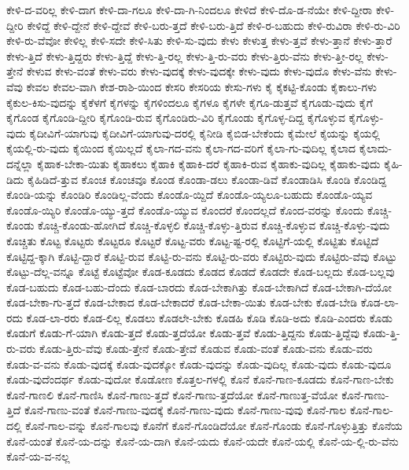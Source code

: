 {ಕೇಳಿ-ದ-ವರಿಲ್ಲ
ಕೇಳಿ-ದಾಗ
ಕೇಳಿ-ದಾ-ಗಲೂ
ಕೇಳಿ-ದಾ-ಗಿ-ನಿಂದಲೂ
ಕೇಳಿದೆ
ಕೇಳಿ-ದೊ-ಡ-ನೆಯೇ
ಕೇಳಿ-ದ್ದೀರಾ
ಕೇಳಿ-ದ್ದೀರಿ
ಕೇಳಿದ್ದೆ
ಕೇಳಿ-ದ್ದೇನೆ
ಕೇಳಿ-ದ್ದೇವೆ
ಕೇಳಿ-ಬರು-ತ್ತದೆ
ಕೇಳಿ-ಬರು-ತ್ತಿದೆ
ಕೇಳಿ-ರ-ಬಹುದು
ಕೇಳಿ-ರುವಿರಾ
ಕೇಳಿ-ರು-ವಿರಿ
ಕೇಳಿ-ರು-ವೆವೋ
ಕೇಳಿಲ್ಲ
ಕೇಳಿ-ಸದೇ
ಕೇಳಿ-ಸಿತು
ಕೇಳಿ-ಸು-ವುದು
ಕೇಳು
ಕೇಳುತ್ತ
ಕೇಳು-ತ್ತವೆ
ಕೇಳು-ತ್ತಾನೆ
ಕೇಳು-ತ್ತಾರೆ
ಕೇಳು-ತ್ತಿದೆ
ಕೇಳು-ತ್ತಿದ್ದರು
ಕೇಳು-ತ್ತಿದ್ದೆ
ಕೇಳು-ತ್ತಿ-ರಲ್ಲ
ಕೇಳು-ತ್ತಿ-ರು-ವರು
ಕೇಳು-ತ್ತಿರು-ವೆನು
ಕೇಳು-ತ್ತೀ-ರಲ್ಲ
ಕೇಳು-ತ್ತೇನೆ
ಕೇಳುವ
ಕೇಳು-ವಂತೆ
ಕೇಳು-ವರು
ಕೇಳು-ವುದಕ್ಕೆ
ಕೇಳು-ವುದಕ್ಕೇ
ಕೇಳು-ವುದು
ಕೇಳು-ವುದೊ
ಕೇಳು-ವೆನು
ಕೇಳು-ವೆವು
ಕೇವಲ
ಕೇವಲ-ವಾಗಿ
ಕೇಶ-ರಾಶಿ-ಯಿಂದ
ಕೇಸರಿ
ಕೇಸರಿಯ
ಕೇಸು-ಗಳು
ಕೈ
ಕೈಕಟ್ಟಿ-ಕೊಂಡು
ಕೈಕಾಲು-ಗಳು
ಕೈಕುಲ-ಕಿಸು-ವುದನ್ನು
ಕೈಕೆಳಗೆ
ಕೈಗಳನ್ನು
ಕೈಗಳಿಂದಲೂ
ಕೈಗಳೂ
ಕೈಗಳೇ
ಕೈಗೂ-ಡುತ್ತವೆ
ಕೈಗೂಡು-ವುದು
ಕೈಗೆ
ಕೈಗೊಂಡ
ಕೈಗೊಂಡಿ-ದ್ದೀರಿ
ಕೈಗೊಂಡಿ-ರುವ
ಕೈಗೊಂಡಿರು-ವಿರಿ
ಕೈಗೊಂಡು
ಕೈಗೊಳ್ಳ-ದಿದ್ದ
ಕೈಗೊಳ್ಳುವ
ಕೈಗೊಳ್ಳು-ವುದು
ಕೈದೀವಿಗೆ-ಯಾಗುವು
ಕೈದೀವಿಗೆ-ಯಾಗುವು-ದರಲ್ಲಿ
ಕೈನೀಡಿ
ಕೈಬಿಡ-ಬೇಕೆಂದು
ಕೈಮೇಲೆ
ಕೈಯನ್ನು
ಕೈಯಲ್ಲಿ
ಕೈಯಲ್ಲಿ-ರು-ವುದು
ಕೈಯಿಂದ
ಕೈಯಿಲ್ಲದೆ
ಕೈಲಾ-ಗದ-ವನು
ಕೈಲಾ-ಗದ-ವರಿಗೆ
ಕೈಲಾ-ಗು-ವುದಿಲ್ಲ
ಕೈಲಾದ
ಕೈಲಾದು-ದನ್ನೆಲ್ಲಾ
ಕೈಹಾಕ-ಬೇಕಾ-ಯಿತು
ಕೈಹಾಕಲು
ಕೈಹಾಕಿ
ಕೈಹಾಕಿ-ದರೆ
ಕೈಹಾಕಿ-ರುವ
ಕೈಹಾಕು-ವುದಿಲ್ಲ
ಕೈಹಾಕು-ವುದು
ಕೈಹಿ-ಡಿದು
ಕೈಹಿಡಿದೆ-ತ್ತುವ
ಕೊಂಚ
ಕೊಂಚವೂ
ಕೊಂಡ
ಕೊಂಡಾ-ಡಲು
ಕೊಂಡಾ-ಡಿವೆ
ಕೊಂಡಾಡಿಸಿ
ಕೊಂಡಿ
ಕೊಂಡಿದ್ದ
ಕೊಂಡಿ-ಯನ್ನು
ಕೊಂಡಿರಿ
ಕೊಂಡಿಲ್ಲ-ವೆಂದು
ಕೊಂಡೊ-ಯ್ದಿದೆ
ಕೊಂಡೊ-ಯ್ಯಲೂ-ಬಹುದು
ಕೊಂಡೊ-ಯ್ಯವ
ಕೊಂಡೊ-ಯ್ಯಿರಿ
ಕೊಂಡೊ-ಯ್ಯು-ತ್ತದೆ
ಕೊಂಡೊ-ಯ್ಯುವ
ಕೊಂದರೆ
ಕೊಂದಲ್ಲದೆ
ಕೊಂದ-ವರನ್ನು
ಕೊಂದು
ಕೊಚ್ಚಿ-ಕೊಂಡು
ಕೊಚ್ಚಿ-ಕೊಂಡು-ಹೋಗಿದೆ
ಕೊಚ್ಚಿ-ಕೊಳ್ಳಲಿ
ಕೊಚ್ಚಿ-ಕೊಳ್ಳು-ತ್ತಿರುವ
ಕೊಚ್ಚಿ-ಕೊಳ್ಳುವ
ಕೊಚ್ಚಿ-ಕೊಳ್ಳು-ವುದು
ಕೊಚ್ಚಿತು
ಕೊಟ್ಟ
ಕೊಟ್ಟರು
ಕೊಟ್ಟರೂ
ಕೊಟ್ಟರೆ
ಕೊಟ್ಟ-ವರು
ಕೊಟ್ಟ-ಷ್ಟ-ರಲ್ಲಿ
ಕೊಟ್ಟಿಗೆ-ಯಲ್ಲಿ
ಕೊಟ್ಟಿತು
ಕೊಟ್ಟಿದೆ
ಕೊಟ್ಟಿದ್ದ-ಕ್ಕಾಗಿ
ಕೊಟ್ಟಿ-ದ್ದಾರೆ
ಕೊಟ್ಟಿ-ರುವ
ಕೊಟ್ಟಿ-ರು-ವನು
ಕೊಟ್ಟಿ-ರು-ವರು
ಕೊಟ್ಟಿರು-ವುದು
ಕೊಟ್ಟಿರು-ವೆವು
ಕೊಟ್ಟು
ಕೊಟ್ಟು-ದೆಲ್ಲ-ವನ್ನೂ
ಕೊಟ್ಟೆ
ಕೊಟ್ಟೆವೋ
ಕೊಡ-ಕೂಡದು
ಕೊಡದ
ಕೊಡದೆ
ಕೊಡದೇ
ಕೊಡ-ಬಲ್ಲದು
ಕೊಡ-ಬಲ್ಲವು
ಕೊಡ-ಬಹುದು
ಕೊಡ-ಬಹು-ದೆಂದು
ಕೊಡ-ಬಾರದು
ಕೊಡ-ಬೇಕಾಗಿತ್ತು
ಕೊಡ-ಬೇಕಾಗಿದೆ
ಕೊಡ-ಬೇಕಾಗಿ-ದೆಯೋ
ಕೊಡ-ಬೇಕಾ-ಗು-ತ್ತದೆ
ಕೊಡ-ಬೇಕಾದ
ಕೊಡ-ಬೇಕಾದರೆ
ಕೊಡ-ಬೇಕಾ-ಯಿತು
ಕೊಡ-ಬೇಕು
ಕೊಡ-ಬೇಡಿ
ಕೊಡ-ಲಾ-ರದು
ಕೊಡ-ಲಾ-ರರು
ಕೊಡ-ಲಿಲ್ಲ
ಕೊಡಲು
ಕೊಡಲೇ-ಬೇಕು
ಕೊಡಹಿ
ಕೊಡಿ
ಕೊಡಿ-ಅದು
ಕೊಡಿ-ಎಂದರು
ಕೊಡು
ಕೊಡುಗೆ
ಕೊಡು-ಗೆ-ಯಾಗಿ
ಕೊಡು-ತ್ತದೆ
ಕೊಡು-ತ್ತದೆಯೋ
ಕೊಡು-ತ್ತವೆ
ಕೊಡು-ತ್ತಿದ್ದನು
ಕೊಡು-ತ್ತಿದ್ದೆವು
ಕೊಡು-ತ್ತಿ-ರು-ವರು
ಕೊಡು-ತ್ತಿರು-ವೆವು
ಕೊಡು-ತ್ತೇನೆ
ಕೊಡು-ತ್ತೇವೆ
ಕೊಡುವ
ಕೊಡು-ವಂತೆ
ಕೊಡು-ವನು
ಕೊಡು-ವರು
ಕೊಡು-ವ-ವನು
ಕೊಡು-ವುದಕ್ಕೆ
ಕೊಡು-ವುದಕ್ಕೋ
ಕೊಡು-ವುದನ್ನು
ಕೊಡು-ವುದಿಲ್ಲ
ಕೊಡು-ವುದು
ಕೊಡು-ವುದೂ
ಕೊಡು-ವುದೆಂದರ್ಥ
ಕೊಡು-ವುದೋ
ಕೊಡೋಣ
ಕೊತ್ತಲ-ಗಳಲ್ಲಿ
ಕೊನೆ
ಕೊನೆ-ಗಾಣ-ಕೂಡದು
ಕೊನೆ-ಗಾಣ-ಬೇಕು
ಕೊನೆ-ಗಾಣಲಿ
ಕೊನೆ-ಗಾಣಿಸಿ
ಕೊನೆ-ಗಾಣು-ತ್ತದೆ
ಕೊನೆ-ಗಾಣು-ತ್ತದೆಯೋ
ಕೊನೆ-ಗಾಣುತ್ತ-ವೆಯೋ
ಕೊನೆ-ಗಾಣು-ತ್ತಿದೆ
ಕೊನೆ-ಗಾಣು-ವಂತೆ
ಕೊನೆ-ಗಾಣು-ವುದಕ್ಕೆ
ಕೊನೆ-ಗಾಣು-ವುದು
ಕೊನೆ-ಗಾಣು-ವುವು
ಕೊನೆ-ಗಾಲ
ಕೊನೆ-ಗಾಲ-ದಲ್ಲಿ
ಕೊನೆ-ಗಾಲ-ವನ್ನು
ಕೊನೆ-ಗಾಲವು
ಕೊನೆಗೆ
ಕೊನೆ-ಗೊಂಡಿದೆಯೋ
ಕೊನೆ-ಗೊಂಡು
ಕೊನೆ-ಗೊಳ್ಳುತ್ತಿತ್ತು
ಕೊನೆಯ
ಕೊನೆ-ಯಂತೆ
ಕೊನೆ-ಯ-ದನ್ನು
ಕೊನೆ-ಯ-ದಾಗಿ
ಕೊನೆ-ಯದು
ಕೊನೆ-ಯದೇ
ಕೊನೆ-ಯಲ್ಲಿ
ಕೊನೆ-ಯ-ಲ್ಲಿ-ರು-ವೆನು
ಕೊನೆ-ಯ-ವ-ನಲ್ಲ
}
